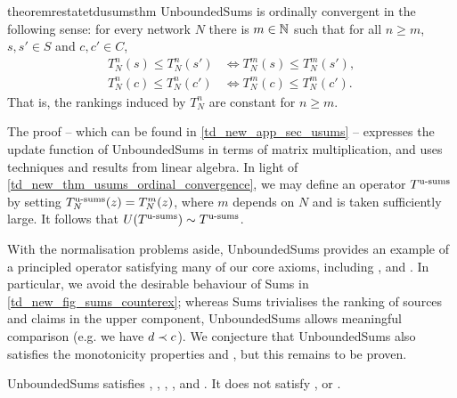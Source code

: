 \begin{restatable}{theorem}{restatetdusumsthm}
    \label{td_new_thm_usums_ordinal_convergence}
    UnboundedSums is ordinally convergent in the following sense: for every
    network $N$ there is $m \in \mathbb{N}$ such that for all $n \ge m$, $s, s' \in
    S$ and $c, c' \in C$,
    \begin{align*}
        T^n_N(s) \le T^n_N(s') &\iff T^m_N(s) \le T^m_N(s'), \\
        T^n_N(c) \le T^n_N(c') &\iff T^m_N(c) \le T^m_N(c').
    \end{align*}
    That is, the rankings induced by $T^n_N$ are constant for $n \ge m$.
\end{restatable}

The proof -- which can be found in \cref{td_new_app_sec_usums} -- expresses the
update function of UnboundedSums in terms of matrix multiplication, and uses
techniques and results from linear algebra.
%
In light of \cref{td_new_thm_usums_ordinal_convergence}, we may define an
operator $T^{\operatorname{u-sums}}$ by setting $T^{\operatorname{u-sums}}_N(z) = T_N^m(z)$, where $m$ depends on $N$
and is taken sufficiently large. It follows that $U(T^{\operatorname{u-sums}}) \sim T^{\operatorname{u-sums}}$.

With the normalisation problems aside, UnboundedSums provides an example of a
principled operator satisfying many of our core axioms, including
\sourcecoherence{}, \claimcoherence{} and \disjointindependence{}. In
particular, we avoid the desirable behaviour of Sums in
\cref{td_new_fig_sums_counterex}; whereas Sums trivialises the ranking of
sources and claims in the upper component, UnboundedSums allows meaningful
comparison (e.g. we have $d \prec c$). We conjecture that UnboundedSums also
satisfies the monotonicity properties \freshposresp{} and \sourceposresp{}, but
this remains to be proven.\footnotemark{}


\begin{theorem}
    UnboundedSums satisfies \sourcecoherence{}, \claimcoherence{}, \symmetry{},
    \marginaltrustworthiness{}, \trustbasedmon{} and \disjointindependence{}.
    It does not satisfy \classicalindependence{}, \conflictcoherence{} or
    \anticoherence{}.
\end{theorem}


